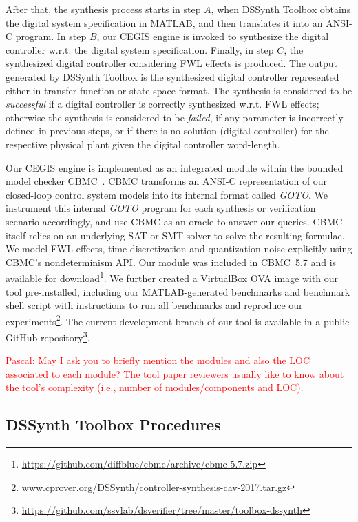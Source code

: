 \documentclass[10pt,conference]{IEEEtran}
\newcommand\tool{{DSSynth Toolbox}\xspace}
\begin{document}
After that, the synthesis process starts in step $A$, when \tool obtains the digital system 
specification in MATLAB, and then translates it into an ANSI-C program. 
In step $B$, our CEGIS engine is invoked to synthesize the digital controller w.r.t. the digital system
specification. Finally, in step $C$, the synthesized digital controller considering FWL effects is produced. 
The output generated by \tool is the synthesized digital controller represented either in transfer-function 
or state-space format. The synthesis is considered to be \emph{successful} if a digital controller is correctly 
synthesized w.r.t. FWL effects; otherwise the synthesis is considered to be \emph{failed}, if any parameter is 
incorrectly defined in previous steps, or if there is no solution (digital controller) for the respective physical plant
 given the digital controller word-length.

Our CEGIS engine is implemented as an integrated module within the bounded model checker CBMC~\cite{cbmc}.  CBMC
transforms an ANSI-C representation of our closed-loop control system models into its internal format called
\emph{GOTO}.  We instrument this internal \emph{GOTO} program for each synthesis or verification scenario accordingly,
and use CBMC as an oracle to answer our queries.  CBMC itself relies on an underlying SAT or SMT solver to solve the
resulting formulae.  We model FWL effects, time discretization and quantization noise explicitly using CBMC's
nondeterminism API.  Our module was included in CBMC~5.7 and is available for
download\footnote{\url{https://github.com/diffblue/cbmc/archive/cbmc-5.7.zip}}.  We further created a VirtualBox OVA image
with our tool pre-installed, including our MATLAB-generated benchmarks and benchmark shell script with instructions
to run all benchmarks and reproduce our
experiments\footnote{\url{www.cprover.org/DSSynth/controller-synthesis-cav-2017.tar.gz}}.  The current development branch
of our tool is available in a public GitHub
repository\footnote{\url{https://github.com/ssvlab/dsverifier/tree/master/toolbox-dssynth}}.

\textcolor{red}{Pascal: May I ask you to briefly mention the modules and also the LOC associated to each module? The tool paper reviewers usually like to know about the tool's complexity (i.e., number of modules/components and LOC).}

\subsection{\tool Procedures}
\end{document}
